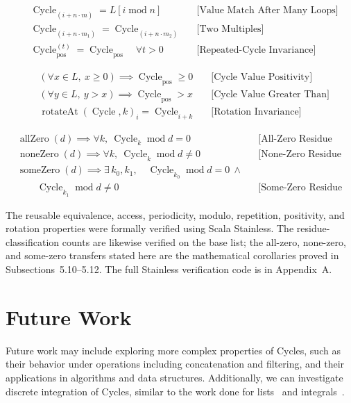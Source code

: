 \begin{equation*}
\begin{aligned}
&\operatorname{Cycle}_{(i+n\cdot m)}=L[i\operatorname{mod}n]
  && \text{[Value Match After Many Loops]} \\
&\operatorname{Cycle}_{(i+n\cdot m_1)}
  =\operatorname{Cycle}_{(i+n\cdot m_2)}
  && \text{[Two Multiples]} \\
&\operatorname{Cycle}^{(t)}_{\text{pos}}
  =\operatorname{Cycle}_{\text{pos}}\quad \forall t>0
  && \text{[Repeated-Cycle Invariance]}
\end{aligned}
\end{equation*}

\begin{equation*}
\begin{aligned}
&(\forall x\in L,\ x\geq 0)
  \implies \operatorname{Cycle}_{\text{pos}}\geq 0
  && \text{[Cycle Value Positivity]} \\
&(\forall y\in L,\ y>x)
  \implies \operatorname{Cycle}_{\text{pos}}>x
  && \text{[Cycle Value Greater Than]} \\
&\operatorname{rotateAt}(\operatorname{Cycle},k)_i
  =\operatorname{Cycle}_{i+k}
  && \text{[Rotation Invariance]}
\end{aligned}
\end{equation*}

\begin{equation*}
\begin{aligned}
&\operatorname{allZero}(d)\implies
  \forall k,\ \operatorname{Cycle}_k\operatorname{mod}d=0
  && \text{[All-Zero Residue Transfer]} \\
&\operatorname{noneZero}(d)\implies
  \forall k,\ \operatorname{Cycle}_k\operatorname{mod}d\neq 0
  && \text{[None-Zero Residue Transfer]} \\
&\operatorname{someZero}(d)\implies \exists\,k_0,k_1,\quad
  \operatorname{Cycle}_{k_0}\operatorname{mod}d=0\ \land{} \\
&\qquad \operatorname{Cycle}_{k_1}\operatorname{mod}d\neq 0
  && \text{[Some-Zero Residue Transfer]}
\end{aligned}
\end{equation*}

The reusable equivalence, access, periodicity, modulo, repetition, positivity,
and rotation properties were formally verified using Scala Stainless. The
residue-classification counts are likewise verified on the base list; the
all-zero, none-zero, and some-zero transfers stated here are the mathematical
corollaries proved in Subsections~5.10--5.12. The full Stainless verification
code is in Appendix~A.

\section{Future Work}

Future work may include exploring more complex properties of Cycles, such as
their behavior under operations including concatenation and filtering, and
their applications in algorithms and data structures. Additionally, we can
investigate discrete integration of Cycles, similar to the work done for
lists~\cite{mata2026lists} and integrals~\cite{mata2026integral}.
